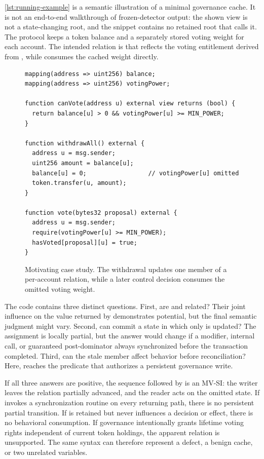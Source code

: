 \autoref{lst:running-example} is a semantic illustration of a minimal governance cache. It is not an end-to-end walkthrough of frozen-detector output: the shown  view is not a state-changing root, and the snippet contains no retained root that calls it. The protocol keeps a token balance and a separately stored voting weight for each account. The intended relation is that  reflects the voting entitlement derived from , while  consumes the cached weight directly.

\begin{figure}[t]
\begin{verbatim}
mapping(address => uint256) balance;
mapping(address => uint256) votingPower;

function canVote(address u) external view returns (bool) {
  return balance[u] > 0 && votingPower[u] >= MIN_POWER;
}

function withdrawAll() external {
  address u = msg.sender;
  uint256 amount = balance[u];
  balance[u] = 0;                 // votingPower[u] omitted
  token.transfer(u, amount);
}

function vote(bytes32 proposal) external {
  address u = msg.sender;
  require(votingPower[u] >= MIN_POWER);
  hasVoted[proposal][u] = true;
}
\end{verbatim}
\caption{Motivating case study. The withdrawal updates one member of a per-account relation, while a later control decision consumes the omitted voting weight.}
\label{lst:running-example}
\end{figure}

The code contains three distinct questions. First, are  and  related? Their joint influence on the value returned by  demonstrates potential, but the final semantic judgment might vary. Second, can  commit a state in which only  is updated? The assignment is locally partial, but the answer would change if a modifier, internal call, or guaranteed post-dominator always synchronized  before the transaction completed. Third, can the stale member affect behavior before reconciliation? Here,  reaches the predicate that authorizes a persistent governance write.

If all three answers are positive, the sequence  followed by  is an MV-SI: the writer leaves the relation partially advanced, and the reader acts on the omitted state. If  invokes a synchronization routine on every returning path, there is no persistent partial transition. If  is retained but never influences a decision or effect, there is no behavioral consumption. If governance intentionally grants lifetime voting rights independent of current token holdings, the apparent relation is unsupported. The same syntax can therefore represent a defect, a benign cache, or two unrelated variables.

